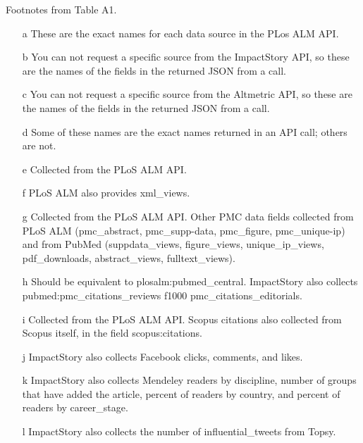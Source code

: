 \documentclass[letterpaper,superscriptaddress,showkeys,longbibliography]{revtex4-1}\usepackage{graphicx, color}
\begin{document}
Footnotes from Table A1.
\singlespacing
\begin{itemize}
    \item[a] These are the exact names for each data source in the PLos ALM API.
    \item[b] You can not request a specific source from the ImpactStory API, so these are the names of the fields in the returned JSON from a call.
    \item[c] You can not request a specific source from the Altmetric API, so these are the names of the fields in the returned JSON from a call.
    \item[d] Some of these names are the exact names returned in an API call; others are not.
    \item[e] Collected from the PLoS ALM API. 
    \item[f] PLoS ALM also provides xml\_views. 
    \item[g] Collected from the PLoS ALM API. Other PMC data fields collected from PLoS ALM (pmc\_abstract, pmc\_supp-data, pmc\_figure, pmc\_unique-ip) and from PubMed (suppdata\_views, figure\_views, unique\_ip\_views, pdf\_downloads, abstract\_views, fulltext\_views).
    \item[h] Should be equivalent to plosalm:pubmed\_central. ImpactStory also collects pubmed:pmc\_citations\_reviews f1000 pmc\_citations\_editorials.
    \item[i] Collected from the PLoS ALM API. Scopus citations also collected from Scopus itself, in the field scopus:citations.
    \item[j] ImpactStory also collects Facebook clicks, comments, and likes. 
    \item[k] ImpactStory also collects Mendeley readers by discipline, number of groups that have added the article, percent of readers by country, and percent of readers by career\_stage. 
    \item[l] ImpactStory also collects the number of influential\_tweets from Topsy.
\end{itemize}
\end{document}
